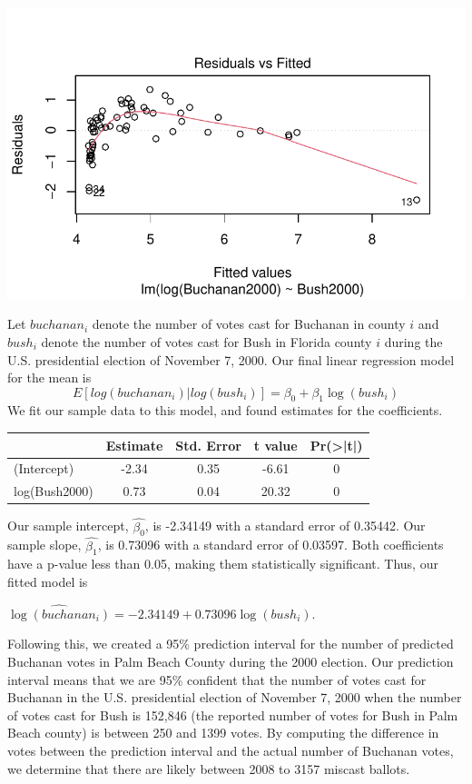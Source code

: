 \documentclass[
  letterpaper,
  DIV=11,
  numbers=noendperiod]{scrartcl}
\begin{document}
\includegraphics{case_study_1_files/figure-pdf/unnamed-chunk-4-1.pdf}

Let \(buchanan_i\) denote the number of votes cast for Buchanan in
county \(i\) and \(bush_i\) denote the number of votes cast for Bush in
Florida county \(i\) during the U.S. presidential election of November
7, 2000. Our final linear regression model for the mean is
\[E[log(buchanan_i) | log(bush_i)] = \beta_0 + \beta_1\log(bush_i)\] We
fit our sample data to this model, and found estimates for the
coefficients.

\begin{table}[H]
\centering
\begin{tabular}[t]{lcccc}
\toprule
  & Estimate & Std. Error & t value & Pr(>|t|)\\
\midrule
(Intercept) & -2.34 & 0.35 & -6.61 & 0\\
log(Bush2000) & 0.73 & 0.04 & 20.32 & 0\\
\bottomrule
\end{tabular}
\end{table}

Our sample intercept, \(\hat{\beta_0}\), is -2.34149 with a standard
error of 0.35442. Our sample slope, \(\hat{\beta_1}\), is 0.73096 with a
standard error of 0.03597. Both coefficients have a p-value less than
0.05, making them statistically significant. Thus, our fitted model is

\(\widehat{\log(buchanan_i)} = -2.34149 + 0.73096\log(bush_i).\)

Following this, we created a 95\% prediction interval for the number of
predicted Buchanan votes in Palm Beach County during the 2000 election.
Our prediction interval means that we are 95\% confident that the number
of votes cast for Buchanan in the U.S. presidential election of November
7, 2000 when the number of votes cast for Bush is 152,846 (the reported
number of votes for Bush in Palm Beach county) is between 250 and 1399
votes. By computing the difference in votes between the prediction
interval and the actual number of Buchanan votes, we determine that
there are likely between 2008 to 3157 miscast ballots.
\end{document}
